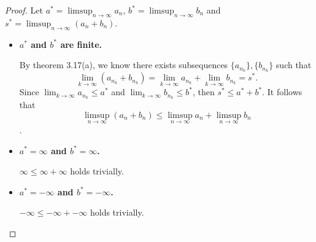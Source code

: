 \begin{Exercise}
	\begin{proof}
		Let $a^*=\limsup_{n\to\infty} a_n$, $b^*=\limsup_{n\to\infty} b_n$ and $s^*=\limsup_{n\to\infty} (a_n + b_n)$.
		
		\begin{itemize}
			\item \textbf{$a^*$ and $b^*$ are finite.}
			
			By theorem 3.17(a), we know there exists subsequences $\{a_{n_k}\}, \{b_{n_k}\}$ such that
			$$
			\lim_{k\to\infty} (a_{n_k} + b_{n_k})
			= \lim_{k\to\infty} a_{n_k} + \lim_{k\to\infty} b_{n_k}
			= s^*.
			$$
			Since $\lim_{k\to\infty} a_{n_k} \leq a^*$ and $\lim_{k\to\infty} b_{n_k} \leq b^*$, then $s^* \leq a^* + b^*$.
			It follows that
			$$
			\limsup_{n\to\infty} (a_n + b_n)
			\leq \limsup_{n\to\infty} a_n + \limsup_{n\to\infty} b_n
			$$.
			
			\item \textbf{$a^*=\infty$ and $b^*=\infty$.}
			
			$\infty \leq \infty + \infty$ holds trivially.
			
			\item \textbf{$a^*=-\infty$ and $b^*=-\infty$.}
			
			$-\infty \leq -\infty + -\infty$ holds trivially.
		\end{itemize}
	\end{proof}
\end{Exercise}
